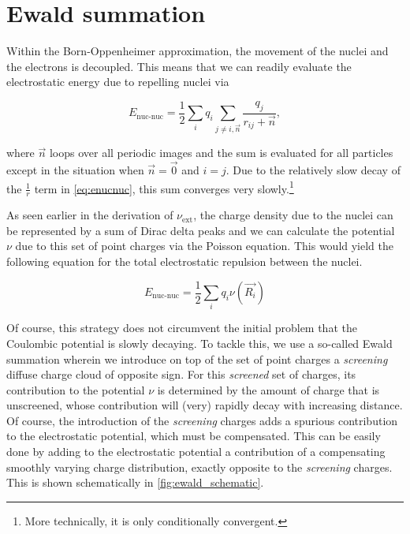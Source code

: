 \section{Ewald summation}
\label{chap:ewald}

Within the Born-Oppenheimer approximation, the movement of the nuclei and the electrons is decoupled. This means that we can readily evaluate the electrostatic energy due to repelling nuclei via

\begin{equation}
    E_{\text{nuc-nuc}} = \frac{1}{2}\sum_{i}q_{i}\sum_{j \neq i,\vec{n}} \frac{q_{j}}{r_{ij} + \vec{n}},
    \label{eq:enucnuc}
\end{equation}

where $\vec{n}$ loops over all periodic images and the sum is evaluated for all particles except in the situation when $\vec{n} = \vec{0}$ and $i = j$. Due to the relatively slow decay of the $\frac{1}{r}$ term in \cref{eq:enucnuc}, this sum converges very slowly.\footnote{More technically, it is only conditionally convergent.}

As seen earlier in the derivation of $\nu_{\text{ext}}$, the charge density due to the nuclei can be represented by a sum of Dirac delta peaks and we can calculate the potential $\nu$ due to this set of point charges via the Poisson equation. This would yield the following equation for the total electrostatic repulsion between the nuclei.

\begin{equation}
    E_{\text{nuc-nuc}} = \frac{1}{2} \sum_{i} q_{i} \nu(\vec{R_{i}})
    \label{eq:enucnuc_realspace}
\end{equation}

Of course, this strategy does not circumvent the initial problem that the Coulombic potential is slowly decaying. To tackle this, we use a so-called Ewald summation wherein we introduce on top of the set of point charges a \textit{screening} diffuse charge cloud of opposite sign. For this \textit{screened} set of charges, its contribution to the potential $\nu$ is determined by the amount of charge that is unscreened, whose contribution will (very) rapidly decay with increasing distance. Of course, the introduction of the \textit{screening} charges adds a spurious contribution to the electrostatic potential, which must be compensated. This can be easily done by adding to the electrostatic potential a contribution of a compensating smoothly varying charge distribution, exactly opposite to the \textit{screening} charges. This is shown schematically in \cref{fig:ewald_schematic}.

